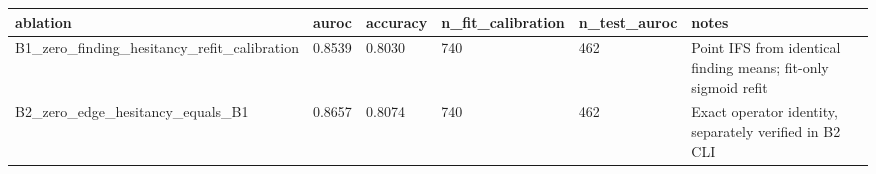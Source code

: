 \begin{tabular}{llllll}
\hline
ablation & auroc & accuracy & n\_fit\_calibration & n\_test\_auroc & notes \\
\hline
B1\_zero\_finding\_hesitancy\_refit\_calibration & 0.8539 & 0.8030 & 740 & 462 & Point IFS from identical finding means; fit-only sigmoid refit \\
B2\_zero\_edge\_hesitancy\_equals\_B1 & 0.8657 & 0.8074 & 740 & 462 & Exact operator identity, separately verified in B2 CLI \\
\hline
\end{tabular}
